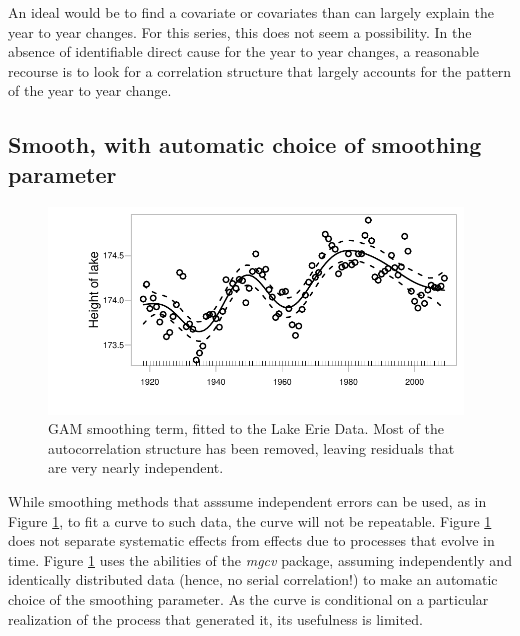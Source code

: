 An ideal would be to find a covariate or covariates than can largely
explain the year to year changes.  For this series, this does not seem
a possibility.  In the absence of identifiable direct cause for the
year to year changes, a reasonable recourse is to look for a
correlation structure that largely accounts for the pattern of the
year to year change.  

\subsection*{Smooth, with automatic choice of smoothing parameter}

\begin{figure}
\begin{Schunk}


\centerline{\includegraphics[width=0.98\textwidth]{figs/9-gamErie-1} }

\end{Schunk}
\caption{GAM smoothing term, fitted to the Lake Erie Data.
    Most of the autocorrelation structure has been
    removed, leaving residuals that are very nearly independent.
  }\label{lh-smoothplot}
\end{figure}

\begin{marginfigure}[-3.5cm]
\begin{Schunk}
\end{Schunk}
\end{marginfigure}

While smoothing methods that asssume independent errors can be
used, as in Figure \ref{lh-smoothplot}, to fit a curve to such
data, the curve will not be repeatable.  Figure \ref{lh-smoothplot}
does not separate systematic effects from effects due to processes
that evolve in time. Figure \ref{lh-smoothplot} uses the
abilities of the {\em mgcv} package, assuming independently and
identically distributed data (hence, no serial correlation!) to
make an automatic choice of the smoothing parameter.  
As the curve is conditional on a particular realization of the process
that generated it, its usefulness is limited.

